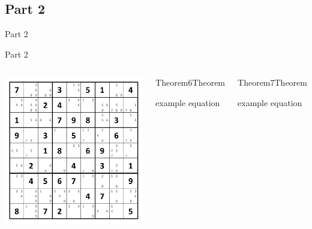 \documentclass[xcolor=dvipsnames,table]{beamer}
\begin{document}
\subsection{Part 2}{Part 2}
	\begin{frame}{Part 2}
		\begin{columns}
		\begin{center}
			\includegraphics[height=.5\textheight]{images/imagem19.jpg}
		\end{center}
		\begin{block}{Theorem6}{Theorem}
		\begin{center}
			{example equation}
		\end{center}
		\end{block}
		\begin{block}{Theorem7}{Theorem}
		\begin{center}
			{example equation}
		\end{center}
		\end{block}
		\end{columns}
	\end{frame}	

\end{document}
